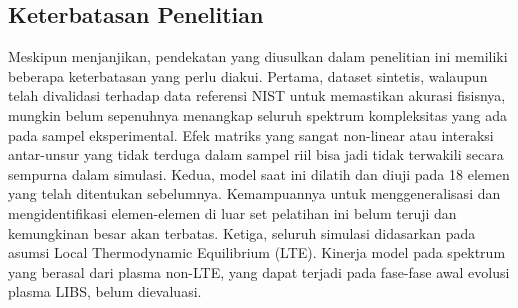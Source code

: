 \subsection{Keterbatasan Penelitian}
Meskipun menjanjikan, pendekatan yang diusulkan dalam penelitian ini memiliki beberapa keterbatasan yang perlu diakui. Pertama, dataset sintetis, walaupun telah divalidasi terhadap data referensi NIST untuk memastikan akurasi fisisnya, mungkin belum sepenuhnya menangkap seluruh spektrum kompleksitas yang ada pada sampel eksperimental. Efek matriks yang sangat non-linear atau interaksi antar-unsur yang tidak terduga dalam sampel riil bisa jadi tidak terwakili secara sempurna dalam simulasi. Kedua, model saat ini dilatih dan diuji pada 18 elemen yang telah ditentukan sebelumnya. Kemampuannya untuk menggeneralisasi dan mengidentifikasi elemen-elemen di luar set pelatihan ini belum teruji dan kemungkinan besar akan terbatas. Ketiga, seluruh simulasi didasarkan pada asumsi Local Thermodynamic Equilibrium (LTE). Kinerja model pada spektrum yang berasal dari plasma non-LTE, yang dapat terjadi pada fase-fase awal evolusi plasma LIBS, belum dievaluasi.